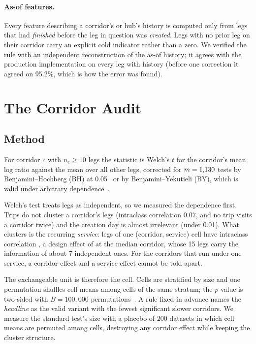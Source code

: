 \documentclass[pdflatex,sn-basic]{sn-jnl}
\begin{document}
\paragraph{As-of features.} Every feature describing a corridor's or hub's history is computed only from legs that had \emph{finished} before the leg in question was \emph{created}. Legs with no prior leg on their corridor carry an explicit cold indicator rather than a zero. We verified the rule with an independent reconstruction of the as-of history; it agrees with the production implementation on every leg with history (before one correction it agreed on 95.2\%, which is how the error was found).

\section{The Corridor Audit}\label{sec:audit}
\subsection{Method}
For corridor $c$ with $n_c\ge10$ legs the statistic is Welch's $t$ for the corridor's mean log ratio against the mean over all other legs, corrected for $m=1{,}130{}$ tests by Benjamini--Hochberg (BH) at 0.05~\cite{benjamini1995controlling} or by Benjamini--Yekutieli (BY), which is valid under arbitrary dependence~\cite{benjamini2001control}.

Welch's test treats legs as independent, so we measured the dependence first. Trips do not cluster a corridor's legs (intraclass correlation 0.07, and no trip visits a corridor twice) and the creation day is almost irrelevant (under 0.01). What clusters is the recurring \emph{service}: legs of one (corridor, service) cell have intraclass correlation \fzDepIccServiceCellDpTwo{}, a design effect of \fzDepDesignEffectMedianDpTwo{} at the median corridor, whose 15 legs carry the information of about 7 independent ones. For the \fzDepSingleServiceCorridors{} corridors that run under one service, a corridor effect and a service effect cannot be told apart.

The exchangeable unit is therefore the cell. Cells are stratified by size and one permutation shuffles cell means among cells of the same stratum; the $p$-value is two-sided with $B=100{,}000$ permutations~\cite{phipson2010permutation}. A rule fixed in advance names the \emph{headline} as the valid variant with the fewest significant slower corridors. We measure the standard test's size with a placebo of 200 datasets in which cell means are permuted among cells, destroying any corridor effect while keeping the cluster structure.
\end{document}
